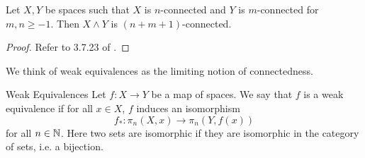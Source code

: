 \begin{prp}\label{prp:SmashConn} Let $X,Y$ be spaces such that $X$ is $n$-connected and $Y$ is $m$-connected for $m,n\geq -1$. Then $X\wedge Y$ is $(n+m+1)$-connected. 
\begin{proof}
Refer to 3.7.23 of \cite{CHT}. 
\end{proof}
\end{prp}

We think of weak equivalences as the limiting notion of connectedness. 

\begin{defn}{Weak Equivalences}{} Let $f:X\to Y$ be a map of spaces. We say that $f$ is a weak equivalence if for all $x\in X$, $f$ induces an isomorphism $$f_\ast:\pi_n(X,x)\to\pi_n(Y,f(x))$$ for all $n\in\mathbb{N}$. Here two sets are isomorphic if they are isomorphic in the category of sets, i.e. a bijection. 
\end{defn}


